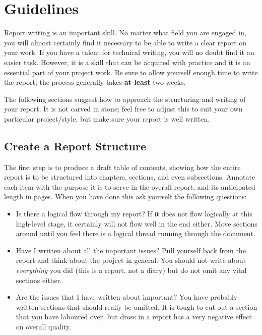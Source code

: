 \documentclass[]{final_report}
\begin{document}
\maketitle

\tableofcontents
\newpage


\chapter {Guidelines}
Report writing is an important skill. No matter what field you are engaged in, you will almost certainly find it necessary to be able to write a clear report on your work. If you have a talent for technical writing, you will no doubt find it an easier task. However, it is a skill that can be acquired with practice and it is an essential part of your project work. Be sure to allow yourself enough time to write the report; the process generally takes {\bf at least} two weeks. 

The following sections suggest how to approach the structuring and writing of your report. It is not carved in stone; feel free to adjust this to suit your own particular project/style, but make sure your report is well written.

\section{Create a Report Structure}

The first step is to produce a draft table of contents, showing how the entire report is to be structured into chapters, sections, and even subsections. Annotate each item with the purpose it is to serve in the overall report, and its anticipated length in pages. When you have done this ask yourself the following questions:

\begin{itemize}
\item Is there a logical flow through my report? If it does not flow logically at this high-level stage, it certainly will not flow well in the end either. Move sections around until you feel there is a logical thread running through the document.
\item Have I written about all the important issues? Pull yourself back from the report and think about the project in general. You should not write about {\sl everything} you did (this is a report, not a diary) but do not omit any vital sections either.
\item Are the issues that I have written about important? You have probably written sections that should really be omitted. It is tough to cut out a section that you have laboured over, but dross in a report has a very negative effect on overall quality.
\end{itemize}
\end{document}
